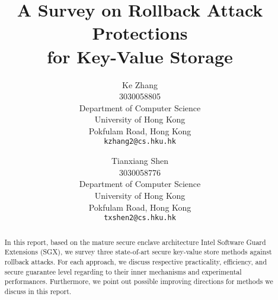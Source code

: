 \documentclass{acm_proc_article-csis8101}
\begin{document}
%

\title{A Survey on Rollback Attack Protections\\for Key-Value Storage}
%

\author{
Ke Zhang\\
3030058805\\
Department of Computer Science\\
University of Hong Kong \\
Pokfulam Road, Hong Kong\\
\texttt{kzhang2@cs.hku.hk}
\and Tianxiang Shen\\
3030058776\\
Department of Computer Science\\
University of Hong Kong \\
Pokfulam Road, Hong Kong \\
\texttt{txshen2@cs.hku.hk}
}

%
\maketitle
\begin{abstract}
In this report, based on the mature secure enclave architecture Intel Software Guard Extensions (SGX), we survey three state-of-art secure key-value store methods against rollback attacks. For each approach, we discuss respective practicality, efficiency, and secure guarantee level regarding to their inner mechanisms and experimental performances. Furthermore, we point out possible improving directions for methods we discuss in this report.

\end{abstract}







% 



%

\newpage


\end{document}

